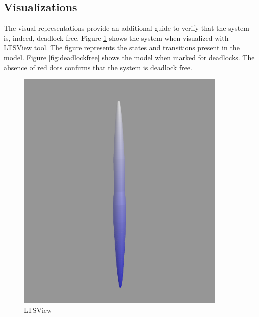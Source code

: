 \documentclass[a4paper,12pt]{article}
\begin{document}
\subsection{Visualizations}
The visual representations provide an additional guide to verify that the system is, indeed, deadlock free. Figure \ref{fig:ltsview-1} shows the system when visualized with LTSView tool. The figure represents the states and transitions present in the model. Figure \ref{fig:deadlockfree} shows the model when marked for deadlocks. The absence of red dots confirms that the system is deadlock free.
\begin{figure}[ht]
    \centering
    \begin{minipage}{0.45\textwidth}
        \centering
        \includegraphics[width=0.9\textwidth]{3D-Model.png} \caption{LTSView}
        \label{fig:ltsview-1}
    \end{minipage}\hfill
    \begin{minipage}{0.45\textwidth}
        \centering

\end{minipage}
\end{figure}
\end{document}
